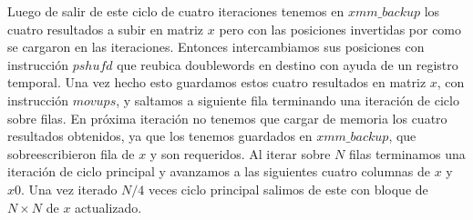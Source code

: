\par Luego de salir de este ciclo de cuatro iteraciones tenemos en $xmm\_backup$ los cuatro resultados a subir en matriz $x$ pero con las posiciones invertidas por como se cargaron en las iteraciones. Entonces
intercambiamos sus posiciones con instrucción $pshufd$ que reubica doublewords en destino con 
ayuda de un registro temporal. Una vez hecho esto guardamos estos cuatro resultados en matriz $x$, con instrucción $movups$, y saltamos a siguiente fila terminando una iteración de ciclo sobre filas. En próxima iteración no tenemos que cargar de memoria los cuatro resultados obtenidos, ya que los tenemos guardados en
$xmm\_backup$, que sobreescribieron fila de $x$ y son requeridos.
Al iterar sobre $N$ filas terminamos una iteración de ciclo principal y avanzamos a las siguientes cuatro columnas de $x$ y $x0$. Una vez iterado $N/4$ veces ciclo principal salimos de este con bloque de 
$N\times N$ de $x$ actualizado.\newline

